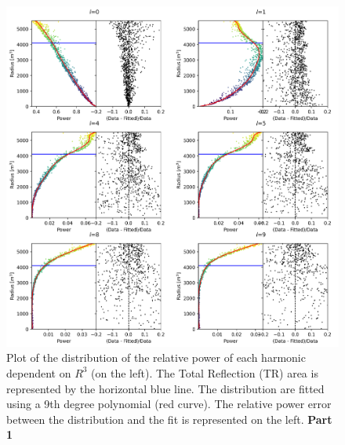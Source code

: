 \documentclass[../main.tex]{subfiles}
\begin{document}
\begin{figure}[ht]
  \centering
  \includegraphics[width=\linewidth]{images/jgnn/harmonic/power_fit.png}
  \caption{Plot of the distribution of the relative power of each harmonic dependent on $R^3$ (on the left). The Total Reflection (TR) area is represented by the horizontal blue line. The distribution are fitted using a 9th degree polynomial (red curve). The relative power error between the distribution and the fit is represented on the left. \textbf{Part 1}}
  \label{fig:annex:jgnn:harmonic:fit1}
\end{figure}
\end{document}
